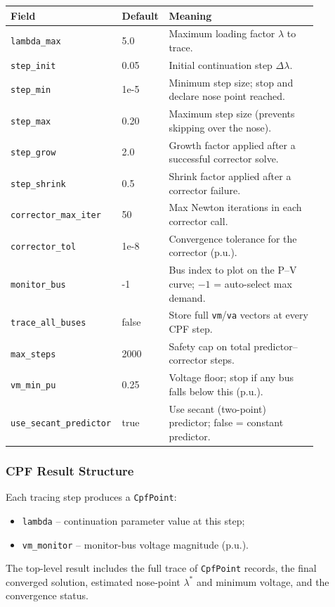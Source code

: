 \begin{longtable}{L{0.26\linewidth}L{0.13\linewidth}L{0.48\linewidth}}
\toprule
Field & Default & Meaning \\
\midrule
\endhead
\texttt{lambda\_max} & 5.0 & Maximum loading factor \(\lambda\) to trace. \\
\texttt{step\_init} & 0.05 & Initial continuation step \(\Delta\lambda\). \\
\texttt{step\_min} & 1e-5 & Minimum step size; stop and declare nose point reached. \\
\texttt{step\_max} & 0.20 & Maximum step size (prevents skipping over the nose). \\
\texttt{step\_grow} & 2.0 & Growth factor applied after a successful corrector solve. \\
\texttt{step\_shrink} & 0.5 & Shrink factor applied after a corrector failure. \\
\texttt{corrector\_max\_iter} & 50 & Max Newton iterations in each corrector call. \\
\texttt{corrector\_tol} & 1e-8 & Convergence tolerance for the corrector (p.u.). \\
\texttt{monitor\_bus} & -1 & Bus index to plot on the P--V curve; $-1$ = auto-select max demand. \\
\texttt{trace\_all\_buses} & false & Store full \texttt{vm}/\texttt{va} vectors at every CPF step. \\
\texttt{max\_steps} & 2000 & Safety cap on total predictor--corrector steps. \\
\texttt{vm\_min\_pu} & 0.25 & Voltage floor; stop if any bus falls below this (p.u.). \\
\texttt{use\_secant\_predictor} & true & Use secant (two-point) predictor; false = constant predictor. \\
\bottomrule
\end{longtable}

\subsubsection{CPF Result Structure}

Each tracing step produces a \texttt{CpfPoint}:
\begin{itemize}
  \item \texttt{lambda} -- continuation parameter value at this step;
  \item \texttt{vm\_monitor} -- monitor-bus voltage magnitude (p.u.).
\end{itemize}
The top-level result includes the full trace of \texttt{CpfPoint} records, the
final converged solution, estimated nose-point \(\lambda^*\) and minimum
voltage, and the convergence status.

